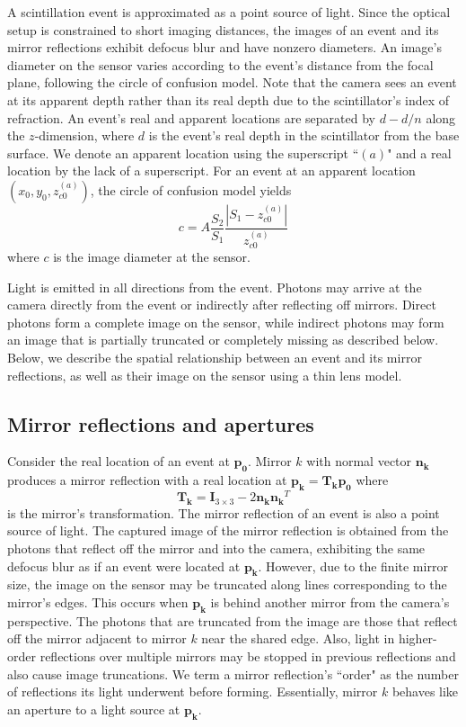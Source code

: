 A scintillation event is approximated as a point source of light.
Since the optical setup is constrained to short imaging distances, 
the images of an event and its mirror reflections exhibit defocus blur and 
have nonzero diameters.
An image's diameter on the sensor varies according to the event's distance from 
the focal plane, following the circle of confusion model.
Note that the camera sees an event at its apparent depth rather than its real 
depth due to the scintillator's index of refraction.
An event's real and apparent locations are separated by $d-d/n$ along the 
$z$-dimension, where $d$ is the event's real depth in the scintillator from the
base surface.
We denote an apparent location using the superscript ``$(a)$" and a real location 
by the lack of a superscript.
For an event at an apparent location $(x_0,y_0,z_{c0}^{(a)})$, 
the circle of confusion model yields
\begin{equation} \label{eqn:circ_of_conf}
c=A\frac{S_2}{S_1}\frac{|S_1-z_{c0}^{(a)}|}{z_{c0}^{(a)}}
\end{equation}
where $c$ is the image diameter at the sensor.

Light is emitted in all directions from the event.
Photons may arrive at the camera directly from the event or indirectly after 
reflecting off mirrors.
Direct photons form a complete image on the sensor, while indirect photons may 
form an image that is partially truncated or completely missing as described below.
Below, we describe the spatial relationship between an event and its mirror 
reflections, as well as their image on the sensor using a thin lens model.

\subsection{Mirror reflections and apertures}

Consider the real location of an event at $\bm{p_0}$.
Mirror $k$ with normal vector $\bm{n_k}$ produces a mirror reflection with a real 
location at 
$\bm{p_k}=\bm{T_k}\bm{p_0}$
where
\begin{equation} \label{eqn:ref_trans}
\bm{T_k}=\bm{I}_{3\times3} - 2\bm{n_k}\bm{n_k}^T
\end{equation}
is the mirror's transformation.
The mirror reflection of an event is also a point source of light.
The captured image of the mirror reflection is obtained from the photons that 
reflect off the mirror and into the camera, exhibiting the same defocus blur as if 
an event were located at $\bm{p_k}$.
However, due to the finite mirror size, the image on the sensor may be truncated 
along lines corresponding to the mirror's edges.
This occurs when $\bm{p_k}$ is behind another mirror from the camera's perspective.
The photons that are truncated from the image are those that reflect off the 
mirror adjacent to mirror $k$ near the shared edge.
Also, light in higher-order reflections over multiple mirrors may be stopped 
in previous reflections and also cause image truncations.
We term a mirror reflection's ``order" as the number of reflections its light 
underwent before forming.
Essentially, mirror $k$ behaves like an aperture to a light source at $\bm{p_k}$. 


